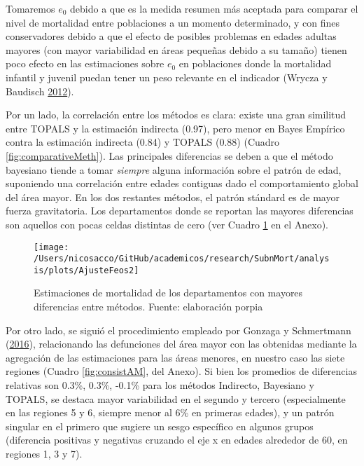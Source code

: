 \documentclass[12pt,spanish,]{article}
\begin{document}
Tomaremos \(e_0\) debido a que es la medida resumen más aceptada para
comparar el nivel de mortalidad entre poblaciones a un momento
determinado, y con fines conservadores debido a que el efecto de
posibles problemas en edades adultas mayores (con mayor variabilidad en
áreas pequeñas debido a su tamaño) tienen poco efecto en las
estimaciones sobre \(e_0\) en poblaciones donde la mortalidad infantil y
juvenil puedan tener un peso relevante en el indicador (Wrycza y
Baudisch \protect\hyperlink{ref-Wrycza2012}{2012}).

Por un lado, la correlación entre los métodos es clara: existe una gran
similitud entre TOPALS y la estimación indirecta (0.97), pero menor en
Bayes Empírico contra la estimación indirecta (0.84) y TOPALS (0.88)
(Cuadro \ref{fig:comparativeMeth}). Las principales diferencias se deben
a que el método bayesiano tiende a tomar \emph{siempre} alguna
información sobre el patrón de edad, suponiendo una correlación entre
edades contiguas dado el comportamiento global del área mayor. En los
dos restantes métodos, el patrón stándard es de mayor fuerza
gravitatoria. Los departamentos donde se reportan las mayores
diferencias son aquellos con pocas celdas distintas de cero (ver Cuadro
\ref{fig:Feos} en el Anexo).

\begin{figure}

{\centering \texttt{[image: /Users/nicosacco/GitHub/academicos/research/SubnMort/analysis/plots/AjusteFeos2]} 

}

\caption{Estimaciones de mortalidad de los departamentos con mayores diferencias entre métodos. Fuente: elaboración porpia}\label{fig:Feos}
\end{figure}

Por otro lado, se siguió el procedimiento empleado por Gonzaga y
Schmertmann (\protect\hyperlink{ref-Gonzaga_Schmertmann_2016}{2016}),
relacionando las defunciones del área mayor con las obtenidas mediante
la agregación de las estimaciones para las áreas menores, en nuestro
caso las siete regiones (Cuadro \ref{fig:consistAM}, del Anexo). Si bien
los promedios de diferencias relativas son 0.3\%, 0.3\%, -0.1\% para los
métodos Indirecto, Bayesiano y TOPALS, se destaca mayor variabilidad en
el segundo y tercero (especialmente en las regiones 5 y 6, siempre menor
al 6\% en primeras edades), y un patrón singular en el primero que
sugiere un sesgo específico en algunos grupos (diferencia positivas y
negativas cruzando el eje x en edades alrededor de 60, en regiones 1, 3
y 7).
\end{document}

